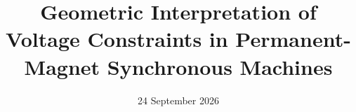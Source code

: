 \title{Geometric Interpretation of Voltage Constraints in Permanent-Magnet Synchronous Machines}
\author{}
\date{24 September 2026}
\newcommand{\PaperAbstract}{%
This paper derives the steady-state voltage limit of a permanent-magnet
synchronous machine as an affine quadratic inequality in the $dq$ current
plane.  The conic type is determined from the quadratic part rather than
assumed from machine terminology.  Completing the square identifies the
center; spectral decomposition identifies the principal directions and
semi-axis lengths; and the classical double-angle rotation formula is shown
to be the same calculation in coordinates.  Parameter limits clarify the
roles of resistance, speed, saliency, permanent-magnet flux, and available
voltage.  Current and torque constraints are then added, so maximum torque per
ampere, field weakening, and maximum torque per voltage emerge as tangency
problems.  Degenerate and non-elliptic cases are stated explicitly.}
